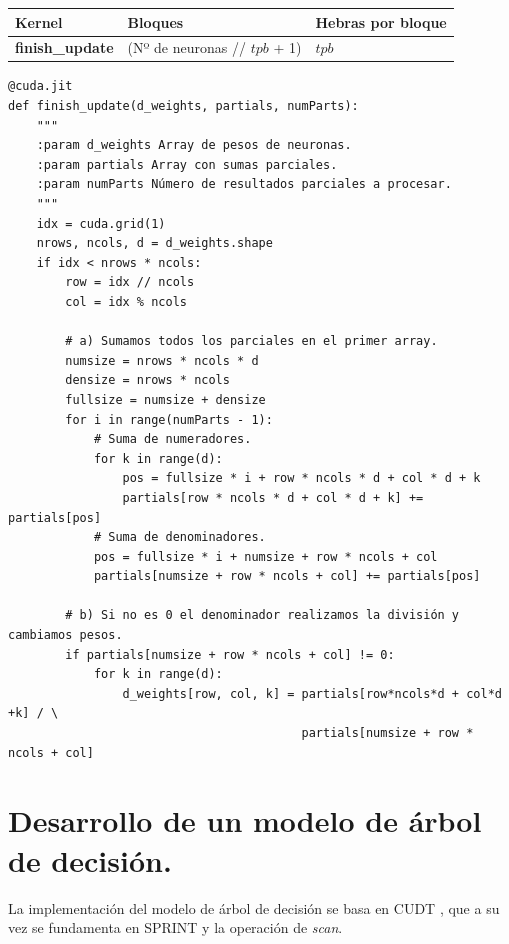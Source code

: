 \begin{table}[ht]
\begin{tabular}{@{}lll@{}}
\toprule
\textbf{Kernel}        & \textbf{Bloques}                                 & \textbf{Hebras por bloque}                                                                       \\ \midrule
\textbf{finish\_update} & (Nº de neuronas // $tpb$ + 1) & $tpb$ \\ \bottomrule
\end{tabular}
\end{table}

\begin{code}
\begin{verbatim}
@cuda.jit
def finish_update(d_weights, partials, numParts):
    """
    :param d_weights Array de pesos de neuronas.
    :param partials Array con sumas parciales.
    :param numParts Número de resultados parciales a procesar.
    """
    idx = cuda.grid(1)
    nrows, ncols, d = d_weights.shape
    if idx < nrows * ncols:
        row = idx // ncols
        col = idx % ncols
        
        # a) Sumamos todos los parciales en el primer array.
        numsize = nrows * ncols * d
        densize = nrows * ncols
        fullsize = numsize + densize
        for i in range(numParts - 1):
            # Suma de numeradores.
            for k in range(d):
                pos = fullsize * i + row * ncols * d + col * d + k
                partials[row * ncols * d + col * d + k] += partials[pos]
            # Suma de denominadores.
            pos = fullsize * i + numsize + row * ncols + col
            partials[numsize + row * ncols + col] += partials[pos]
    
        # b) Si no es 0 el denominador realizamos la división y cambiamos pesos.
        if partials[numsize + row * ncols + col] != 0:
            for k in range(d):
                d_weights[row, col, k] = partials[row*ncols*d + col*d +k] / \
                                         partials[numsize + row * ncols + col]
\end{verbatim}
\label{code:ending}
\end{code}

\newpage
\section{Desarrollo de un modelo de árbol de decisión.}
La implementación del modelo de árbol de decisión se basa en CUDT \cite{cudt}, que a su vez se fundamenta en SPRINT \cite{sprint} y la operación de \textit{scan}.

